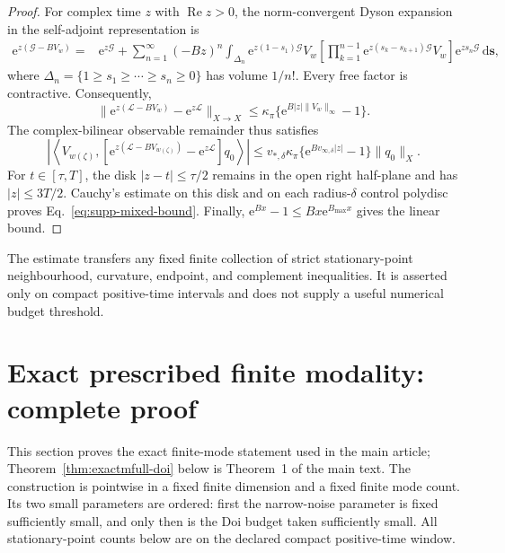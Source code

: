 \documentclass[aps,physrev,onecolumn,amsmath,amssymb,longbibliography]{revtex4-2}
\newcommand{\dd}{\mathrm d}
\newcommand{\e}{\mathrm e}
\newcommand{\Lfree}{\mathcal L}
\begin{document}
\begin{proof}
For complex time \(z\) with \(\operatorname{Re}z>0\), the
norm-convergent Dyson expansion in the self-adjoint representation is
\begin{align}
 \e^{z(\mathcal G-BV_w)}
 ={}&\e^{z\mathcal G}
 +\sum_{n=1}^{\infty}(-Bz)^n
 \int_{\Delta_n}\e^{z(1-s_1)\mathcal G}V_w
 \left[\prod_{k=1}^{n-1}
 \e^{z(s_k-s_{k+1})\mathcal G}V_w\right]
 \e^{zs_n\mathcal G}\,\dd\bm s ,
 \label{eq:supp-dyson}
\end{align}
where
\(\Delta_n=\{1\ge s_1\ge\cdots\ge s_n\ge0\}\) has volume \(1/n!\).
Every free factor is contractive.  Consequently,
\begin{equation}
 \|\e^{z(\Lfree-BV_w)}-\e^{z\Lfree}\|_{X\to X}
 \le\kappa_\pi\{\e^{B|z|\|V_w\|_\infty}-1\}.
 \label{eq:supp-operator-bound}
\end{equation}
The complex-bilinear observable remainder thus satisfies
\begin{equation}
 \left|\left\langle V_{w(\zeta)},
 [\e^{z(\Lfree-BV_{w(\zeta)})}-\e^{z\Lfree}]q_0
 \right\rangle\right|
 \le v_{*,\delta}\kappa_\pi
 \{\e^{Bv_{\infty,\delta}|z|}-1\}\|q_0\|_X .
 \label{eq:supp-remainder}
\end{equation}
For \(t\in[\tau,T]\), the disk \(|z-t|\le\tau/2\) remains in the open
right half-plane and has \(|z|\le3T/2\).  Cauchy's estimate on this disk and
on each radius-\(\delta\) control polydisc proves
Eq.~\eqref{eq:supp-mixed-bound}.  Finally,
\(\e^{Bx}-1\le Bx\e^{B_{\max}x}\) gives the linear bound.
\end{proof}

The estimate transfers any fixed finite collection of strict
stationary-point neighbourhood, curvature, endpoint, and complement
inequalities.  It is asserted only on compact positive-time intervals and
does not supply a useful numerical budget threshold.


\section{Exact prescribed finite modality: complete proof}
\label{sec:exactmfull-proof}

This section proves the exact finite-mode statement used in the main article;
Theorem~\ref{thm:exactmfull-doi} below is Theorem~1 of the main text.
The construction is pointwise in a fixed finite dimension and
a fixed finite mode count.  Its two small parameters are ordered: first the
narrow-noise parameter is fixed sufficiently small, and only then is the Doi
budget taken sufficiently small.  All stationary-point counts below are on
the declared compact positive-time window.
\end{document}
